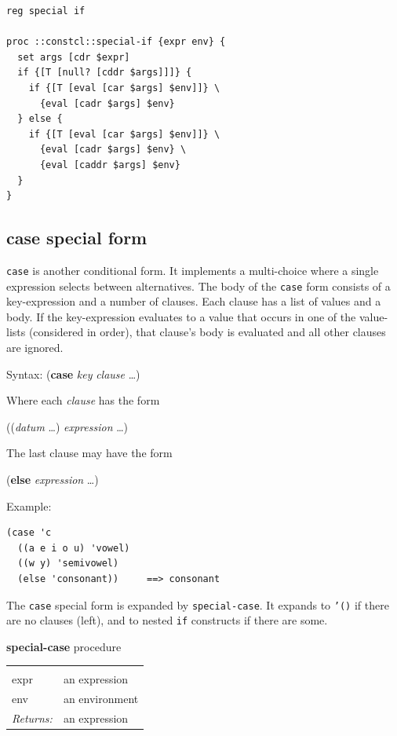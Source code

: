 \documentclass[twoside]{report}
\begin{document}
\begin{lstlisting}
reg special if

proc ::constcl::special-if {expr env} {
  set args [cdr $expr]
  if {[T [null? [cddr $args]]]} {
    if {[T [eval [car $args] $env]]} \
      {eval [cadr $args] $env}
  } else {
    if {[T [eval [car $args] $env]]} \
      {eval [cadr $args] $env} \
      {eval [caddr $args] $env}
  }
}
\end{lstlisting}

\subsection{case special form}
\label{case-special-form}

\texttt{case} is another conditional form. It implements a multi-choice where a single expression selects between alternatives. The body of the \texttt{case} form consists of a key-expression and a number of clauses. Each clause has a list of values and a body. If the key-expression evaluates to a value that occurs in one of the value-lists (considered in order), that clause's body is evaluated and all other clauses are ignored.

Syntax: (\textbf{case} \emph{key} \emph{clause} \ldots )

Where each \emph{clause} has the form

((\emph{datum} \ldots ) \emph{expression} \ldots )

The last clause may have the form

(\textbf{else} \emph{expression} \ldots )

Example:

\begin{verbatim}
(case 'c
  ((a e i o u) 'vowel)
  ((w y) 'semivowel)
  (else 'consonant))     ==> consonant
\end{verbatim}

The \texttt{case} special form is expanded by \texttt{special-case}. It expands to \texttt{'()} if there are no clauses (left), and to nested \texttt{if} constructs if there are some.

\textbf{special-case} procedure

\noindent\begin{tabular}{ |p{1.9cm} p{8cm}| }
\hline
\rowcolor[HTML]{CCCCCC} \multicolumn{2}{|l|}{\bf special-case (internal)} \\
expr & an expression \\
env & an environment \\
\textit{Returns:} & an expression \\
\hline
\end{tabular}
\end{document}
